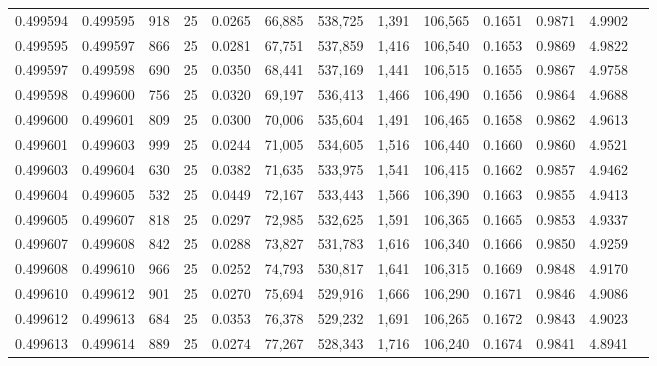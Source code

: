 \begin{tabular}{rrrrrrrrrrrrr}
0.499594 & 0.499595 &   918 &  25 &                                     0.0265 &  66,885 & 538,725 &   1,391 & 106,565 & 0.1651 & 0.9871 & 4.9902 \\
0.499595 & 0.499597 &   866 &  25 &                                     0.0281 &  67,751 & 537,859 &   1,416 & 106,540 & 0.1653 & 0.9869 & 4.9822 \\
0.499597 & 0.499598 &   690 &  25 &                                     0.0350 &  68,441 & 537,169 &   1,441 & 106,515 & 0.1655 & 0.9867 & 4.9758 \\
0.499598 & 0.499600 &   756 &  25 &                                     0.0320 &  69,197 & 536,413 &   1,466 & 106,490 & 0.1656 & 0.9864 & 4.9688 \\
0.499600 & 0.499601 &   809 &  25 &                                     0.0300 &  70,006 & 535,604 &   1,491 & 106,465 & 0.1658 & 0.9862 & 4.9613 \\
0.499601 & 0.499603 &   999 &  25 &                                     0.0244 &  71,005 & 534,605 &   1,516 & 106,440 & 0.1660 & 0.9860 & 4.9521 \\
0.499603 & 0.499604 &   630 &  25 &                                     0.0382 &  71,635 & 533,975 &   1,541 & 106,415 & 0.1662 & 0.9857 & 4.9462 \\
0.499604 & 0.499605 &   532 &  25 &                                     0.0449 &  72,167 & 533,443 &   1,566 & 106,390 & 0.1663 & 0.9855 & 4.9413 \\
0.499605 & 0.499607 &   818 &  25 &                                     0.0297 &  72,985 & 532,625 &   1,591 & 106,365 & 0.1665 & 0.9853 & 4.9337 \\
0.499607 & 0.499608 &   842 &  25 &                                     0.0288 &  73,827 & 531,783 &   1,616 & 106,340 & 0.1666 & 0.9850 & 4.9259 \\
0.499608 & 0.499610 &   966 &  25 &                                     0.0252 &  74,793 & 530,817 &   1,641 & 106,315 & 0.1669 & 0.9848 & 4.9170 \\
0.499610 & 0.499612 &   901 &  25 &                                     0.0270 &  75,694 & 529,916 &   1,666 & 106,290 & 0.1671 & 0.9846 & 4.9086 \\
0.499612 & 0.499613 &   684 &  25 &                                     0.0353 &  76,378 & 529,232 &   1,691 & 106,265 & 0.1672 & 0.9843 & 4.9023 \\
0.499613 & 0.499614 &   889 &  25 &                                     0.0274 &  77,267 & 528,343 &   1,716 & 106,240 & 0.1674 & 0.9841 & 4.8941 \\

\end{tabular}
